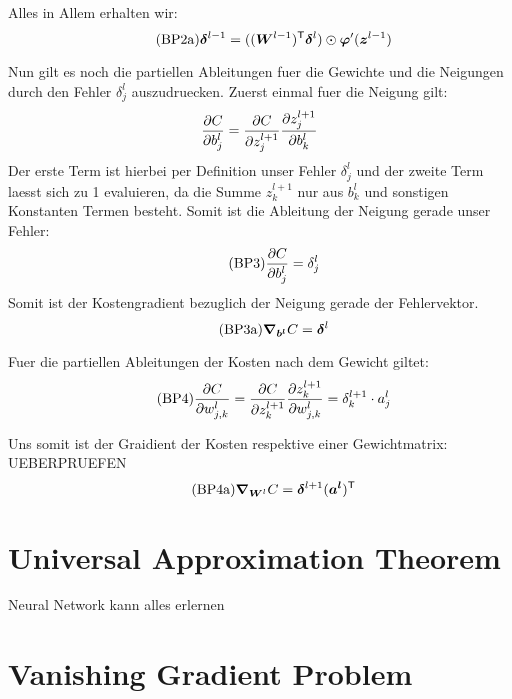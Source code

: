 Alles in Allem erhalten wir:
\begin{equation}\tag{BP2a}
  \bm{\delta}^{l-1} = ((\bm{W}^{l-1})^{\mathsf{T}} \bm{\delta}^l) \odot \bm{\varphi}'(\bm{z}^{l-1})
\end{equation}

\para{}

Nun gilt es noch die partiellen Ableitungen fuer die Gewichte und die Neigungen
durch den Fehler $\delta_j^l$ auszudruecken.
Zuerst einmal fuer die Neigung gilt:
\begin{equation*}
  \frac{\partial C}{\partial b_j^l} = \frac{\partial C}{\partial z_j^{l+1}} \frac{\partial z_j^{l+1}}{\partial b_k^l}
\end{equation*}
Der erste Term ist hierbei per Definition unser Fehler $\delta_j^l$ und der
zweite Term laesst sich zu 1 evaluieren, da die Summe $z_k^{l+1}$ nur aus
$b_k^l$ und sonstigen Konstanten Termen besteht.
Somit ist die Ableitung der Neigung gerade unser Fehler:
\begin{equation}\tag{BP3}
  \frac{\partial C}{\partial b_j^l} = \delta_j^l
\end{equation}
Somit ist der Kostengradient bezuglich der Neigung gerade der Fehlervektor.
\begin{equation}\tag{BP3a}
  \bm{\nabla}_{\bm{b^l}} C =  \bm{\delta}^l
\end{equation}

Fuer die partiellen Ableitungen der Kosten nach dem Gewicht giltet:
\begin{equation}\tag{BP4}
  \frac{\partial C}{\partial w_{j,k}^l} = \frac{\partial C}{\partial z_k^{l+1}} \frac{\partial z_k^{l+1}}{\partial w_{j,k}^l} = \delta_k^{l+1} \cdot a_j^l
\end{equation}

Uns somit ist der Graidient der Kosten respektive einer Gewichtmatrix:
UEBERPRUEFEN
\begin{equation}\tag{BP4a}
  \bm{\nabla}_{\bm{W}^l} C = \bm{\delta}^{l+1} (\bm{a^l})^{\mathsf{T}}
\end{equation}


\cite{Nielsen}


\section{Universal Approximation Theorem}\label{sec:UAT}
Neural Network kann alles erlernen

\section{Vanishing Gradient Problem}

